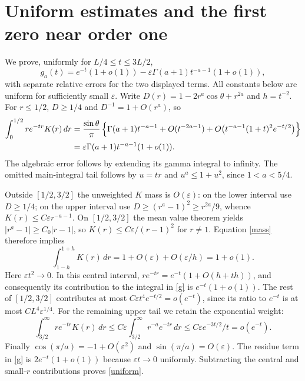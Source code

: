 \documentclass[11pt]{article}
\begin{document}
\section*{Uniform estimates and the first zero near order one}
We prove, uniformly for $L/4\leq t\leq3L/2$,
\begin{equation}\label{uniform}
 g_a(t)=e^{-t}(1+o(1))
          -\varepsilon\Gamma(a+1)t^{-a-1}(1+o(1)),
\end{equation}
with separate relative errors for the two displayed terms.
All constants below are uniform for sufficiently small $\varepsilon$.
Write $D(r)=1-2r^a\cos\theta+r^{2a}$ and $h=t^{-2}$.
For $r\leq1/2$, $D\geq1/4$ and $D^{-1}=1+O(r^a)$, so
\begin{align*}
 \int_0^{1/2}r e^{-tr}K(r)\,dr
 &= {\sin\theta\over\pi}\left\{
 \Gamma(a+1)t^{-a-1}+O(t^{-2a-1})
       +O\bigl(t^{-a-1}(1+t)^2 e^{-t/2}\bigr)\right\}\\
 &=\varepsilon\Gamma(a+1)t^{-a-1}(1+o(1)).
\end{align*}
The algebraic error follows by extending its gamma integral to
infinity. The omitted main-integral tail follows by $u=tr$ and
$u^a\leq1+u^2$, since $1<a<5/4$.

Outside $[1/2,3/2]$ the unweighted $K$ mass is $O(\varepsilon)$:
on the lower interval use $D\geq1/4$; on the upper interval use
$D\geq(r^a-1)^2\geq r^{2a}/9$, whence
$K(r)\leq C\varepsilon r^{-a-1}$. On $[1/2,3/2]$ the mean value
theorem yields $|r^a-1|\geq C_0|r-1|$, so
$K(r)\leq C\varepsilon/(r-1)^2$ for $r\ne1$. Equation \eqref{mass}
therefore implies
\[
 \int_{1-h}^{1+h}K(r)\,dr
       =1+O(\varepsilon)+O(\varepsilon/h)=1+o(1).
\]
Here $\varepsilon t^2\to0$. In this central interval,
$r e^{-tr}=e^{-t}(1+O(h+th))$, and consequently its contribution
to the integral in \eqref{g} is $e^{-t}(1+o(1))$.
The rest of $[1/2,3/2]$ contributes at most
$C\varepsilon t^4e^{-t/2}=o(e^{-t})$, since its ratio to
$e^{-t}$ is at most $C L^4\varepsilon^{1/4}$.
For the remaining upper tail we retain the exponential weight:
\[
 \int_{3/2}^\infty r e^{-tr}K(r)\,dr
 \leq C\varepsilon\int_{3/2}^\infty r^{-a}e^{-tr}\,dr
 \leq C\varepsilon e^{-3t/2}/t=o(e^{-t}).
\]
Finally $\cos(\pi/a)=-1+O(\varepsilon^2)$ and
$\sin(\pi/a)=O(\varepsilon)$. The residue term in \eqref{g} is
$2e^{-t}(1+o(1))$ because $\varepsilon t\to0$ uniformly.
Subtracting the central and small-$r$ contributions proves
\eqref{uniform}.
\end{document}
